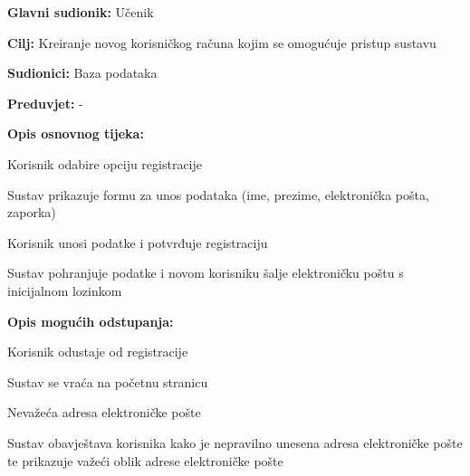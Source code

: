 					\noindent {}
					\begin{packed_item}
	
						\item \textbf{Glavni sudionik: }Učenik
						\item  \textbf{Cilj:} Kreiranje novog korisničkog računa kojim se omogućuje pristup sustavu
						\item  \textbf{Sudionici:} Baza podataka
						\item  \textbf{Preduvjet:} -
						\item  \textbf{Opis osnovnog tijeka:}  
						
						\item[] \begin{packed_enum}
	
							\item Korisnik odabire opciju registracije
							\item Sustav prikazuje formu za unos podataka (ime, prezime, elektronička pošta, zaporka)
							\item Korisnik unosi podatke i potvrđuje registraciju
							\item Sustav pohranjuje podatke i novom korisniku šalje elektroničku poštu s inicijalnom lozinkom
							
						\end{packed_enum}
						
						\item  \textbf{Opis mogućih odstupanja:}
						
						\item[] \begin{packed_item}
	
							\item[3.a] Korisnik odustaje od registracije
							\item[] \begin{packed_enum}
								
								\item Sustav se vraća na početnu stranicu
								
							\end{packed_enum}
							
							\item[3.b] Nevažeća adresa elektroničke pošte
							\item[] \begin{packed_enum}
								
								\item Sustav obavještava korisnika kako je nepravilno unesena adresa elektroničke pošte te prikazuje važeći oblik adrese elektroničke pošte
								

\end{packed_enum}
\end{packed_item}
\end{packed_item}
